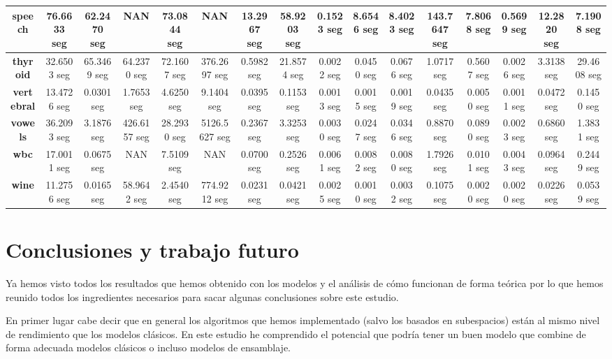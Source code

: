 \begin{table}[H]
{\begin{tabular}{|c|c|c|c|c|c|c|c|c|c|c|c|c|c|c|c|}
		\textbf{speech}           & 76.6633 seg      & 62.2470 seg   & NAN             & 73.0844 seg   & NAN           & 13.2967 seg   & 58.9203 seg  & 0.1523 seg    & 8.6546 seg   & 8.4023 seg   & 143.7647 seg & 7.8068 seg     & 0.5699 seg   & 12.2820 seg  & 7.1908 seg    \\ \hline
		\textbf{thyroid}          & 32.6503 seg      & 65.3469 seg   & 64.2370 seg     & 72.1607 seg   & 376.2697 seg  & 0.5982 seg    & 21.8574 seg  & 0.0022 seg    & 0.0450 seg   & 0.0676 seg   & 1.0717 seg   & 0.5607 seg     & 0.0026 seg   & 3.3138 seg   & 29.4608 seg   \\ \hline
		\textbf{vertebral}        & 13.4726 seg      & 0.0301 seg    & 1.7653 seg      & 4.6250 seg    & 9.1404 seg    & 0.0395 seg    & 0.1153 seg   & 0.0013 seg    & 0.0015 seg   & 0.0019 seg   & 0.0435 seg   & 0.0050 seg     & 0.0011 seg   & 0.0472 seg   & 0.1450 seg    \\ \hline
		\textbf{vowels}           & 36.2093 seg      & 3.1876 seg    & 426.6157 seg    & 28.2930 seg   & 5126.5627 seg & 0.2367 seg    & 3.3253 seg   & 0.0030 seg    & 0.0247 seg   & 0.0346 seg   & 0.8870 seg   & 0.0890 seg     & 0.0023 seg   & 0.6860 seg   & 1.3831 seg    \\ \hline
		\textbf{wbc}              & 17.0011 seg      & 0.0675 seg    & NAN             & 7.5109 seg    & NAN           & 0.0700 seg    & 0.2526 seg   & 0.0061 seg    & 0.0082 seg   & 0.0080 seg   & 1.7926 seg   & 0.0101 seg     & 0.0043 seg   & 0.0964 seg   & 0.2449 seg    \\ \hline
		\textbf{wine}             & 11.2756 seg      & 0.0165 seg    & 58.9642 seg     & 2.4540 seg    & 774.9212 seg  & 0.0231 seg    & 0.0421 seg   & 0.0025 seg    & 0.0010 seg   & 0.0032 seg   & 0.1075 seg   & 0.0020 seg     & 0.0020 seg   & 0.0226 seg   & 0.0539 seg    \\ \hline
	\end{tabular}
}
\end{table}

\section{Conclusiones y trabajo futuro}

Ya hemos visto todos los resultados que hemos obtenido con los modelos y el análisis de cómo funcionan de forma teórica por lo que hemos reunido todos los ingredientes necesarios para sacar algunas conclusiones sobre este estudio.

En primer lugar cabe decir que en general los algoritmos que hemos implementado (salvo los basados en subespacios) están al mismo nivel de rendimiento que los modelos clásicos. En este estudio he comprendido el potencial que podría tener un buen modelo que combine de forma adecuada modelos clásicos o incluso modelos de ensamblaje.

